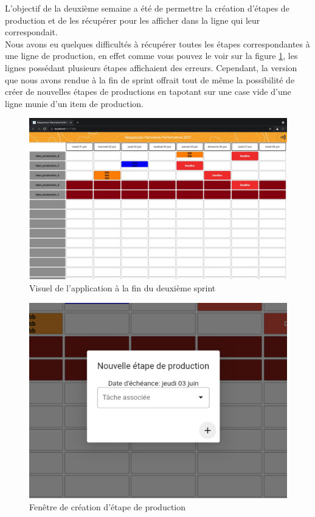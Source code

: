 L'objectif de la deuxième semaine a été de permettre la création d'étapes de production et de les récupérer pour les afficher dans la ligne qui leur correspondait.\\

Nous avons eu quelques difficultés à récupérer toutes les étapes correspondantes à une ligne de production, en effet comme vous pouvez le voir sur la figure \ref{fig:appV2}, les lignes possédant plusieurs étapes affichaient des erreurs. Cependant, la version que nous avons rendue à la fin de sprint offrait tout de même la possibilité de créer de nouvelles étapes de productions en tapotant sur une case vide d'une ligne munie d'un item de production. 


\begin{figure}[!h]
    \centering
    \includegraphics[scale=0.28]{img/app_v2.jpeg}
    \caption{Visuel de l'application à la fin du deuxième sprint}
    \label{fig:appV2}
\end{figure}

\begin{figure}[!h]
    \centering
    \includegraphics[scale=0.28]{img/creation_step.png}
    \caption{Fenêtre de création d'étape de production}
    \label{fig:creationStep}
\end{figure}

